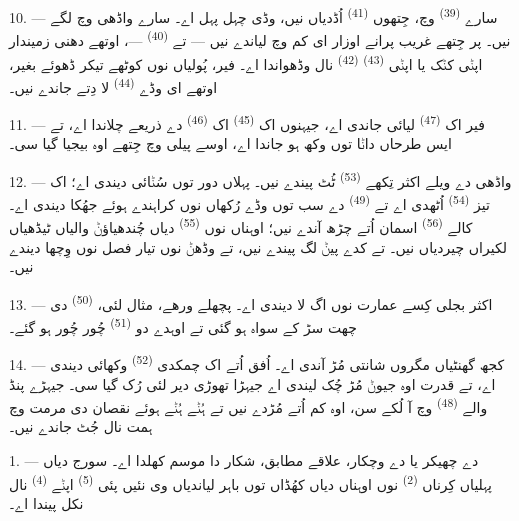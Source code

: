 10. --- سارے  \textsuperscript{(39)} وچ، جِتھوں 
\textsuperscript{(41)} اُڈدیاں نیں، وڈی چہل پہل اے۔ سارے واڈھی وچ لگے نیں۔ پر
جِتھے غریب پرانے اوزار ای کم وچ لیاندے نیں —  تے
 \textsuperscript{(40)} —، اوتھے دھنی زمیندار اپݨی کݨک یا اپݨی
 \textsuperscript{(43)}  \textsuperscript{(42)} نال
وڈھواندا اے۔ فیر، پُولیاں نوں کوٹھے تیکر ڈھوئے بغیر، اوتھے ای وڈے 
\textsuperscript{(44)} لا دِتے جاندے نیں۔

11. --- فیر اک  \textsuperscript{(47)} لیائی جاندی اے، جیہنوں
اک  \textsuperscript{(45)} اک  \textsuperscript{(46)} دے
ذریعے چلاندا اے، تے ایس طرحاں داݨا  توں وکھ ہو جاندا اے، اوسے پیلی
وچ جِتھے اوہ بیجیا گیا سی۔

\VUsaut{5.0mm}
\VUsaut{3.4mm}

12. --- واڈھی دے ویلے اکثر تِکھے  \textsuperscript{(53)} ٹُٹ پیندے
نیں۔ پہلاں دور توں  سُݨائی دیندی اے؛ اک تیز
 \textsuperscript{(54)} اُٹھدی اے تے 
\textsuperscript{(49)} دے سب توں وڈے رُکھاں نوں کراہندے ہوئے جھُکا دیندی اے۔ کالے
 \textsuperscript{(56)} اسمان اُتے چڑھ آندے نیں؛ اوہناں نوں
 \textsuperscript{(55)} دیاں چُندھیاؤݨ والیاں ٹیڈھیاں لکیراں چیردیاں
نیں۔  تے کدے  پیݨ لگ پیندے نیں، تے وڈھݨ نوں تیار فصل
نوں وِچھا دیندے نیں۔

13. --- اکثر بجلی کِسے عمارت نوں اگ لا دیندی اے۔ پچھلے ورھے، مثال لئی،
 \textsuperscript{(50)} دی چھت سڑ کے سواہ ہو گئی تے اوہدے دو
 \textsuperscript{(51)} چُور چُور ہو گئے۔

14. --- کجھ گھنٹیاں مگروں شانتی مُڑ آندی اے۔ اُفق اُتے اک چمکدی 
\textsuperscript{(52)} وکھائی دیندی اے، تے قدرت اوہ جیوݨ مُڑ چُک لیندی اے جیہڑا
تھوڑی دیر لئی رُک گیا سی۔ جیہڑے پنڈ والے  \textsuperscript{(48)} وچ
آ لُکے سن، اوہ کم اُتے مُڑدے نیں تے ہُݨے ہُݨے ہوئے نقصان دی مرمت وچ ہمت نال جُٹ
جاندے نیں۔

\VUsaut{6.0mm}
\VUsaut{3.6mm}

\VUsaut{1.4mm}
\VUsaut{4.0mm}

1. ---  دے چھیکر یا  دے وچکار، علاقے مطابق، شکار دا
موسم کھلدا اے۔ سورج دیاں پہلیاں کِرناں  \textsuperscript{(2)} نوں
اوہناں دیاں کھُڈاں توں باہر لیاندیاں وی نئیں پئی 
\textsuperscript{(5)} اپݨے  \textsuperscript{(4)} نال نکل پیندا اے۔

